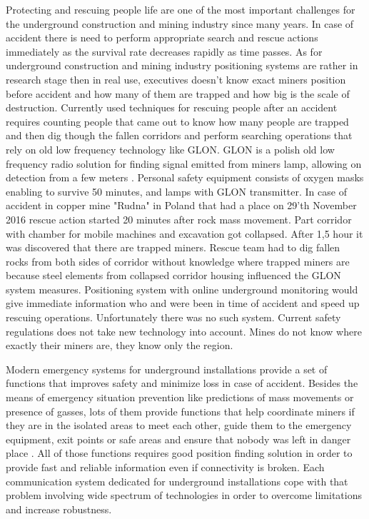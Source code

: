 \documentclass[../main.tex]{subfiles}
\begin{document}
Protecting and rescuing people life are one of the most important challenges for the underground construction and mining industry since many years. In case of accident there is need to perform appropriate search and rescue actions immediately as the survival rate decreases rapidly as time passes. As for underground construction and mining industry positioning systems are rather in research stage then in real use, executives doesn't know exact miners position before accident and how many of them are trapped and how big is the scale of destruction. Currently used techniques for rescuing people after an accident requires counting people that came out to know how many people are trapped and then dig though the fallen corridors and perform searching operations that rely on old low frequency technology like GLON. GLON is a polish old low frequency radio solution for finding signal emitted from miners lamp, allowing on detection from a few meters \cite{GLON}. Personal safety equipment consists of oxygen masks enabling to survive 50 minutes, and lamps with GLON transmitter. In case of accident in copper mine "Rudna" in Poland that had a place on 29'th November 2016  \cite{newspaper_rudna} rescue action started 20 minutes after rock mass movement. Part corridor with chamber for mobile machines and excavation got collapsed. After 1,5 hour it was discovered that there are trapped miners. Rescue team had to dig fallen rocks from both sides of corridor without knowledge where trapped miners are because steel elements from collapsed corridor housing influenced the GLON system measures. Positioning system with online underground monitoring would give immediate information who and were been in time of accident and speed up rescuing operations. Unfortunately there was no such system. Current safety regulations does not take new technology into account. Mines do not know where exactly their miners are, they know only the region.

Modern emergency systems for underground installations provide a set of functions that improves safety and minimize loss in case of accident. Besides the means of emergency situation prevention like predictions of mass movements or presence of gasses, lots of them provide functions that help coordinate miners if they are in the isolated areas to meet each other, guide them to the emergency equipment, exit points or safe areas and ensure that nobody was left in danger place \cite{Thesis_CM}. All of those functions requires good position finding solution in order to provide fast and reliable information even if connectivity is broken. Each communication system dedicated for underground installations cope with that problem involving wide spectrum of technologies in order to overcome limitations and increase robustness\cite{article_mine_communications_safety}.
\end{document}
